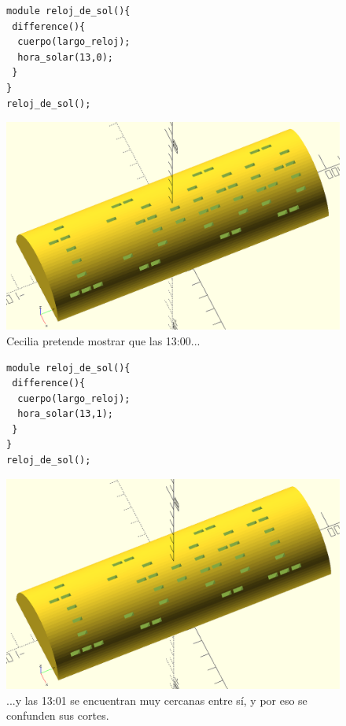 \begin{figure}[ht]
  \begin{minipage}[]{.45\textwidth}
\begin{lstlisting}
module reloj_de_sol(){
 difference(){
  cuerpo(largo_reloj);
  hora_solar(13,0);
 }
}
reloj_de_sol();
\end{lstlisting}%
  \end{minipage}\hfill
  \begin{minipage}[]{.52\textwidth}
    \centering
  \includegraphics[width=\textwidth]{imagenes/13_00}  
  \end{minipage}
  \caption{Cecilia pretende mostrar que las 13:00...}
  \label{fig:13_00}
\end{figure}

\begin{figure}[ht]
  \begin{minipage}[]{.45\textwidth}
\begin{lstlisting}
module reloj_de_sol(){
 difference(){
  cuerpo(largo_reloj);
  hora_solar(13,1);
 }
}
reloj_de_sol();
\end{lstlisting}%
  \end{minipage}\hfill
  \begin{minipage}[]{.52\textwidth}
    \centering
  \includegraphics[width=\textwidth]{imagenes/13_01}  
  \end{minipage}
  \caption{...y las 13:01 se encuentran muy cercanas entre sí, y por
    eso se confunden sus cortes.}
  \label{fig:13_01}
\end{figure}

